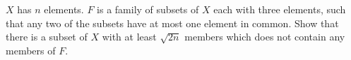 $X$ has $n$ elements. $F$ is a family of subsets of $X$ each with three elements, such that any two of the subsets have at most one element in common. Show that there is a subset of $X$ with at least $\sqrt{2n}$ members which does not contain any members of $F$.